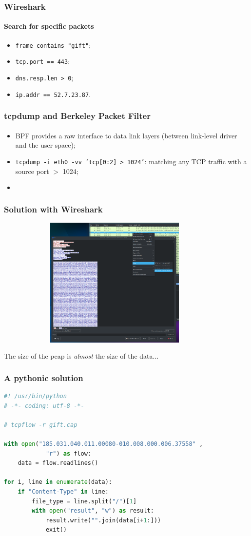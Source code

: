 \documentclass[]{beamer}
\begin{document}
\begin{frame}
\frametitle{Wireshark}
\framesubtitle{Search for specific packets}
\begin{itemize}
    \item \texttt{frame contains "gift"};
    \item \texttt{tcp.port == 443};
    \item \texttt{dns.resp.len > 0};
    \item \texttt{ip.addr == 52.7.23.87}.
\end{itemize}
\end{frame}

\begin{frame}
\frametitle{tcpdump and Berkeley Packet Filter}
\framesubtitle{}
\begin{itemize}
    \item BPF provides a raw interface to data link layers (between link-level driver and the user space);
    \item \texttt{tcpdump -i eth0 -vv 'tcp[0:2] > 1024'}: matching any TCP traffic with a source port $>$ 1024;
    \item 
\end{itemize}
\end{frame}


\begin{frame}
\frametitle{Solution with Wireshark}
\begin{center}
    \includegraphics[height=6.5cm, width=12.0cm]{./images/Wireshark_follow_http_stream.png}
\end{center}
The size of the pcap is \textit{almost} the size of the data...
\end{frame}
 


\begin{frame}[fragile]
\frametitle{A pythonic solution}
\begin{lstlisting}[language=Python]
#! /usr/bin/python
# -*- coding: utf-8 -*-

# tcpflow -r gift.cap

with open("185.031.040.011.00080-010.008.000.006.37558" ,
            "r") as flow:
    data = flow.readlines()

for i, line in enumerate(data):
    if "Content-Type" in line:
        file_type = line.split("/")[1]
        with open("result", "w") as result:
            result.write("".join(data[i+1:]))
            exit()
\end{lstlisting}
\end{frame}
 
\end{document}
